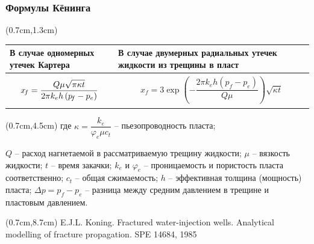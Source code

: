 \documentclass{beamer}
\begin{document}
\begin{frame}
\frametitle{Формулы Кёнинга}
\small
\begin{textblock*}{11cm}(0.7cm,1.3cm)
\begin{tabular}{|p{4.3cm}|p{5.9cm}|}
\hline
В случае одномерных утечек Картера & В случае двумерных радиальных утечек жидкости из трещины в пласт\\
\hline
$$x_{\!f}=\frac{Q\mu\sqrt{\pi\kappa t}}{2\pi k_eh\left(p_{\!f}-p_e\right)}
\vspace*{-3mm}$$ & $$x_{\!f}=3\exp{\!\left(-\frac{2\pi k_e h\left(p_{\!f}-p_e\right)}{Q\mu}\right)}\sqrt{\kappa t}$$ \\
\hline
\end{tabular}
\end{textblock*}

\begin{textblock*}{11cm}(0.7cm,4.5cm)
где
$\kappa=\dfrac{k_e}{\varphi_e\mu c_t}$ -- пьезопроводность пласта;\newline

$Q$ -- расход нагнетаемой в рассматриваемую трещину жидкости;\newline
$\mu$ -- вязкость жидкости;
$t$ -- время закачки;\newline
$k_e$ и $\varphi_e$ -- проницаемость и пористость пласта соответственно;\newline
$c_t$ -- общая сжимаемость;
$h$ -- эффективная толщина (мощность) пласта;
$\Delta p=p_{\!f}-p_e$ -- разница между средним давлением в трещине и пластовым давлением.
\end{textblock*}
\normalsize

\begin{textblock*}{10cm}(0.7cm,8.7cm)
\scriptsize
\textcolor{lit_gray}{E.J.L. Koning. Fractured water-injection wells. Analytical modelling of fracture propagation. SPE 14684, 1985}
\end{textblock*}

\normalsize

\end{frame}
\end{document}
